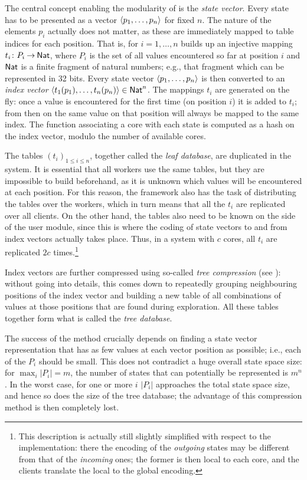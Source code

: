 The central concept enabling the modularity of \LTSMIN is the \emph{state
vector}. Every state has to be presented as a vector ${\langle p_1,\ldots,p_n \rangle}$ for
fixed $n$. The nature of the elements $p_i$ actually does not matter, as these
are immediately mapped to table indices for each position.  That is, for
$i=1,\ldots,n$ \LTSMIN builds up an injective mapping $t_i\colon {P_i} \mathbin{\rightarrow} {\mathsf{Nat}}$,
where $P_i$ is the set of all values encountered so far at position $i$ and
$\mathsf{Nat}$ is a finite fragment of natural numbers; e.g., that fragment which can
be represented in 32 bits. Every state vector ${\langle p_1,\ldots,p_n \rangle}$ is then
converted to an \emph{index vector} ${\langle t_1(p_1),\ldots,t_n(p_n) \rangle}\in \mathsf{Nat}^n$.
The mappings $t_i$ are generated on the fly: once a value is encountered for the first time 
(on position $i$) it is added to $t_i$; 
from then on the same value on that position will always be mapped to the same index.
The function associating a core with each state is computed as a hash on the
index vector, modulo the number of available cores.

The tables $(t_i)_{1\leq i\leq n}$, together called the
\emph{leaf database}, are duplicated in the system. It is
essential that all workers use the same tables, but they are impossible to
build beforehand, as it is unknown which values will be encountered at each
position. For this reason, the \LTSMIN framework also has the task of
distributing the tables over the workers, which in turn means that all the
$t_i$ are replicated over all \LTSMIN clients. On the other hand, the tables
also need to be known on the side of the user module, since this is where the
coding of state vectors to and from index vectors actually takes place. Thus,
in a system with $c$ cores, all $t_i$ are replicated $2c$ times.\footnote{This
  description is actually still slightly simplified with respect to the
  implementation: there the encoding of the \emph{outgoing} states may be
  different from that of the \emph{incoming} ones; the former is then local to
  each core, and the \LTSMIN clients translate the local to the global
  encoding.}

Index vectors are further compressed using so-called \emph{tree compression}
(see \cite{Blom+2008}): without going into details, this comes down to
repeatedly grouping neighbouring positions of the index vector and building a
new table of all combinations of values at those positions that are found
during exploration. All these tables together form what is called the
\emph{tree database}.

The success of the method crucially depends on finding a state vector
representation that has as few values at each vector position as possible;
i.e., each of the $P_i$ should be small. This does not contradict a huge
overall state space size: for $\max_i |P_i|=m$, the number of states that can
potentially be represented is $m^n$. In the worst case, for one or more $i$
$|P_i|$ approaches the total state space size, and hence so does the size of
the tree database; the advantage of this compression method is then completely
lost.

